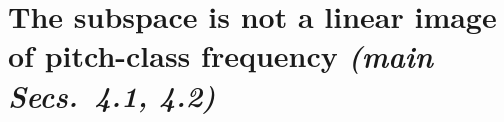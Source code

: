\documentclass{article}
\begin{document}
\section{The subspace is not a linear image of pitch-class frequency \normalfont\textit{(main Secs.~4.1, 4.2)}}
\label{sec:pitchclass}

\end{document}
